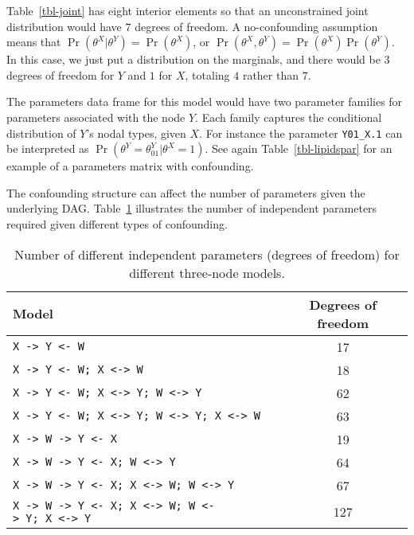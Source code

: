 \documentclass[
  11pt,
  article]{jss}
\begin{document}
Table~\ref{tbl-joint} has eight interior elements so that an
unconstrained joint distribution would have \(7\) degrees of freedom. A
no-confounding assumption means that
\(\Pr(\theta^X | \theta^Y) = \Pr(\theta^X)\), or
\(\Pr(\theta^X, \theta^Y) = \Pr(\theta^X)\Pr(\theta^Y)\). In this case,
we just put a distribution on the marginals, and there would be \(3\)
degrees of freedom for \(Y\) and \(1\) for \(X\), totaling \(4\) rather
than \(7\).

The parameters data frame for this model would have two parameter
families for parameters associated with the node \(Y\). Each family
captures the conditional distribution of \(Y\)'s nodal types, given
\(X\). For instance the parameter \texttt{Y01\_X.1} can be interpreted
as \(\Pr(\theta^Y = \theta^Y_{01} | \theta^X=1)\). See again
Table~\ref{tbl-lipidspar} for an example of a parameters matrix with
confounding.

The confounding structure can affect the number of parameters given the
underlying DAG. Table~\ref{tbl-dof} illustrates the number of
independent parameters required given different types of confounding.

\begin{longtable}[]{@{}lc@{}}

\caption{\label{tbl-dof}Number of different independent parameters
(degrees of freedom) for different three-node models.}

\tabularnewline

\toprule\noalign{}
Model & Degrees of freedom \\
\midrule\noalign{}
\endhead
\bottomrule\noalign{}
\endlastfoot
\texttt{X\ -\textgreater{}\ Y\ \textless{}-\ W} & 17 \\
\texttt{X\ -\textgreater{}\ Y\ \textless{}-\ W;\ X\ \textless{}-\textgreater{}\ W}
& 18 \\
\texttt{X\ -\textgreater{}\ Y\ \textless{}-\ W;\ X\ \textless{}-\textgreater{}\ Y;\ W\ \textless{}-\textgreater{}\ Y}
& 62 \\
\texttt{X\ -\textgreater{}\ Y\ \textless{}-\ W;\ X\ \textless{}-\textgreater{}\ Y;\ W\ \textless{}-\textgreater{}\ Y;\ X\ \textless{}-\textgreater{}\ W}
& 63 \\
\texttt{X\ -\textgreater{}\ W\ -\textgreater{}\ Y\ \textless{}-\ X} &
19 \\
\texttt{X\ -\textgreater{}\ W\ -\textgreater{}\ Y\ \textless{}-\ X;\ W\ \textless{}-\textgreater{}\ Y}
& 64 \\
\texttt{X\ -\textgreater{}\ W\ -\textgreater{}\ Y\ \textless{}-\ X;\ X\ \textless{}-\textgreater{}\ W;\ W\ \textless{}-\textgreater{}\ Y}
& 67 \\
\texttt{X\ -\textgreater{}\ W\ -\textgreater{}\ Y\ \textless{}-\ X;\ X\ \textless{}-\textgreater{}\ W;\ W\ \textless{}-\textgreater{}\ Y;\ X\ \textless{}-\textgreater{}\ Y}
& 127 \\

\end{longtable}
\end{document}
